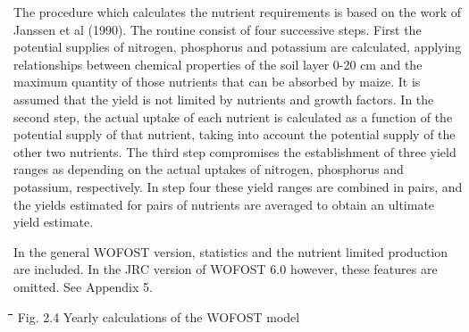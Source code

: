 \bigskip
The procedure which calculates the nutrient requirements is based on the work of Janssen
et al (1990). The routine consist of four successive steps. First the potential supplies of
nitrogen, phosphorus and potassium are calculated, applying relationships between
chemical properties of the soil layer 0-20 cm and the maximum quantity of those nutrients
that can be absorbed by maize. It is assumed that the yield is not limited by nutrients and
growth factors. In the second step, the actual uptake of each nutrient is calculated as a
function of the potential supply of that nutrient, taking into account the potential supply of
the other two nutrients. The third step compromises the establishment of three yield
ranges as depending on the actual uptakes of nitrogen, phosphorus and potassium,
respectively. In step four these yield ranges are combined in pairs, and the yields
estimated for pairs of nutrients are averaged to obtain an ultimate yield estimate.

\bigskip
In the general WOF\-OST version, statis\-tics and the nutrient limited production are
included. In the JRC version of WOFOST 6.0 however, these features are omitted. See
Appendix 5.

\begin{figure}[htbp]
 \begin{center} \end{center}
\end{figure}

\bigskip
\bigskip
\bigskip
\bigskip
\bigskip
\bigskip
\bigskip
\bigskip
\bigskip
\bigskip
\bigskip
\bigskip
\bigskip
\bigskip
\bigskip
\bigskip
\bigskip
\nwln
\begin{tabbing}
\hspace{1.27cm}\=\hspace{1.27cm}\=\hspace{1.27cm}\=\hspace{1.27cm}\=%
\hspace{1.27cm}\=\hspace{1.27cm}\=\hspace{1.27cm}\=\hspace{1.27cm}\=%
\hspace{1.27cm}\=\hspace{1.27cm}\=\kill
Fig. 2.4\> \> Yearly calculations of the WOFOST model
\end{tabbing}

